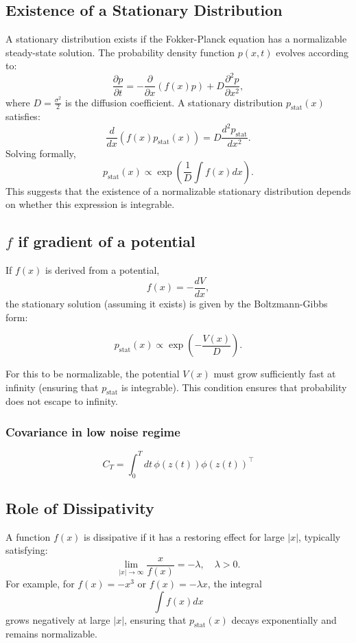 \documentclass{article}
\theoremstyle{definition} \newtheorem{definition}{Definition}
\theoremstyle{remark} \newtheorem{remark}{Remark}
\newcounter{ct}
\begin{document}
\subsection{Existence of a Stationary Distribution}
A stationary distribution exists if the Fokker-Planck equation has a normalizable steady-state solution. The probability density function $p(x,t)$ evolves according to:
\begin{equation}
    \frac{\partial p}{\partial t} = -\frac{\partial}{\partial x} \left( f(x) p \right) + D \frac{\partial^2 p}{\partial x^2},
\end{equation}
where $D = \frac{\sigma^2}{2}$ is the diffusion coefficient. A stationary distribution $p_{\text{stat}}(x)$ satisfies:
\begin{equation}
    \frac{d}{dx} \left( f(x) p_{\text{stat}}(x) \right) = D \frac{d^2 p_{\text{stat}}}{dx^2}.
\end{equation}
Solving formally,
\begin{equation}
    p_{\text{stat}}(x) \propto \exp \left( \frac{1}{D} \int f(x) dx \right).
\end{equation}
This suggests that the existence of a normalizable stationary distribution depends on whether this expression is integrable.

\subsection{$f$ if gradient of a potential}\label{sec:pstat_gradientpotential}
If $f(x)$ is derived from a potential, 
\[
f(x) = - \frac{dV}{dx},
\]
the stationary solution (assuming it exists) is given by the Boltzmann-Gibbs form:

\[
p_{\text{stat}}(x) \propto \exp \left( - \frac{V(x)}{D} \right).
\]

For this to be normalizable, the potential $V(x)$ must grow sufficiently fast at infinity (ensuring that $p_{\text{stat}}$ is integrable). This condition ensures that probability does not escape to infinity.


\subsubsection{Covariance in low noise regime}
\[
C_T = \int_{0}^{T} dt \, \phi(z(t)) \phi(z(t))^\top
\]


\subsection{Role of Dissipativity}
A function $f(x)$ is dissipative if it has a restoring effect for large $\vert x \vert$, typically satisfying:
\begin{equation}
    \lim_{\vert x \vert \to \infty} \frac{x}{f(x)} = -\lambda, \quad \lambda > 0.
\end{equation}
For example, for $f(x) = -x^3$ or $f(x) = -\lambda x$, the integral
\begin{equation}
    \int f(x) dx
\end{equation}
grows negatively at large $\vert x \vert$, ensuring that $p_{\text{stat}}(x)$ decays exponentially and remains normalizable.
\end{document}
